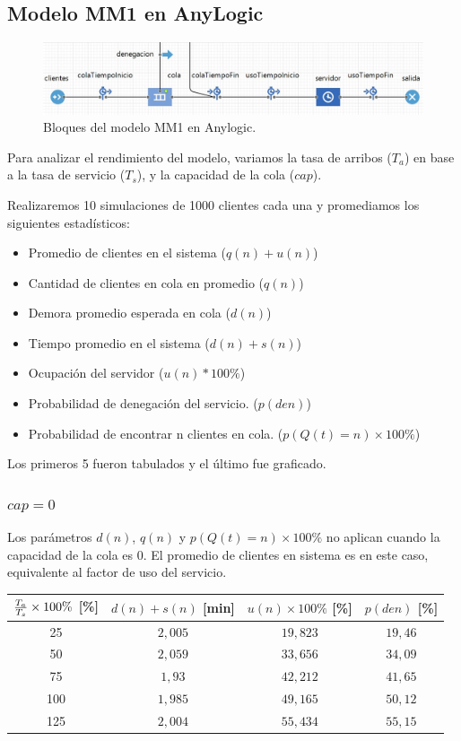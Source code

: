 \subsection{Modelo MM1 en AnyLogic}

\begin{figure}[H]
  \includegraphics[width=\linewidth]{images/anylogic-colas-modelo}
  \caption{Bloques del modelo MM1 en Anylogic.}
\end{figure}

Para analizar el rendimiento del modelo, variamos la tasa de arribos ($T_a$) en base a la tasa de servicio ($T_s$), y
la capacidad de la cola ($cap$).

Realizaremos 10 simulaciones de 1000 clientes cada una y promediamos los siguientes estadísticos:
\begin{itemize}
    \item Promedio de clientes en el sistema ($q(n)+u(n)$)
    \item Cantidad de clientes en cola en promedio ($q(n)$)
    \item Demora promedio esperada en cola ($d(n)$)
    \item Tiempo promedio en el sistema ($d(n)+s(n)$)
    \item Ocupación del servidor ($u(n)*100\%$)
    \item Probabilidad de denegación del servicio. ($p(den)$)
    \item Probabilidad de encontrar n clientes en cola. ($p(Q(t)=n)\times100\%$)
\end{itemize}

Los primeros 5 fueron tabulados y el último fue graficado.

\subsubsection{$cap = 0$}

Los parámetros $d(n)$, $q(n)$ y $p(Q(t)=n)\times100\%$ no aplican cuando la capacidad de la cola es 0.
El promedio de clientes en sistema es en este caso, equivalente al factor de uso del servicio.

\begin{tabular}{||c||c|c|c||}
    \hline \hline
    ${T_a \over T_s}\times100\%$ [\%] & $d(n)+s(n)$ [min] & $u(n)\times100\%$ [\%] & $p(den)$ [\%] \\
    \hline \hline
    25 & $2,005$ & $19,823$ & $19,46$ \\
    \hline
    50 & $2,059$ & $33,656$ & $34,09$ \\
    \hline
    75 & $1,93$ & $42,212$ & $41,65$ \\
    \hline
    100 & $1,985$ & $49,165$ & $50,12$ \\
    \hline
    125 & $2,004$ & $55,434$ & $55,15$ \\
    \hline \hline
\end{tabular}

